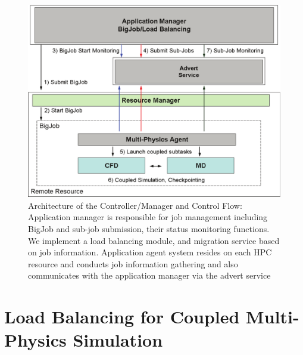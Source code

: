 \documentclass[conference,final]{IEEEtran}
\newcommand{\jhanote}[1]{ {\textcolor{red} { ***Jha: #1 }}}
\newcommand{\jhanote}[1]{}
\begin{document}
\begin{figure}
\centering
\includegraphics[scale=0.38]{Structure_of_BigJob}
\caption{\small Architecture of the Controller/Manager and Control
  Flow: Application manager is responsible for job management
  including BigJob and sub-job submission, their status monitoring
  functions. We implement a load balancing module, and migration
  service based on job information. Application agent system resides
  on each HPC resource and conducts job information gathering and also communicates with the application manager via the advert service}
\label{Fig:BigJob_Structure}
\vspace{-1em}
\end{figure}

\section{Load Balancing for Coupled Multi-Physics Simulation}


\end{document}
